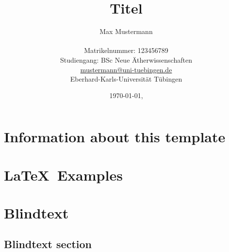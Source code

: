 \documentclass[
11pt,
bibliography=totoc,
numbers=noenddot,
]{scrbook}
\title{Titel}
\author{{\LARGE Max Mustermann} \\
		\\
		Matrikelnummer: 123456789\\
		Studiengang: BSc Neue Ätherwissenschaften \\
		\url{mustermann@uni-tuebingen.de}\\ 
		Eberhard-Karls-Universität Tübingen\\}
\date{\ddmmyyyydate\today, \currenttime}
\begin{document}
\maketitle
\frontmatter
\tableofcontents
\mainmatter 

\chapter{Information about this template}



\chapter{\LaTeX\ Examples}



\chapter{Blindtext}

\lipsum

\section{Blindtext section}

\lipsum


\insertBib
\end{document}
